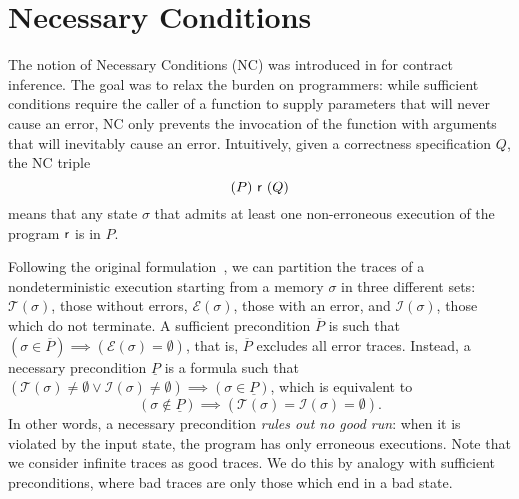 \section{Necessary Conditions}\label{sec:bg:nc}
The notion of Necessary Conditions (NC) was introduced in \cite{CCL11,CCFL13} for contract inference.
The goal was to relax the burden on programmers: while sufficient conditions require the caller of a function to supply parameters that will never cause an error, NC only prevents the invocation of the function with arguments that will inevitably cause an error.
Intuitively, given a correctness specification $Q$, the NC triple
\[
(P)~\mathsf{r}~(Q)
\]
means that any state $\sigma$ that admits at least one non-erroneous execution of the program $\mathsf{r}$ is in $P$.

Following the original formulation~\cite{CCFL13}, we can partition the traces of a nondeterministic execution starting from a memory $\sigma$ in three different sets: $\mathcal{T}(\sigma)$, those without errors, $\mathcal{E}(\sigma)$, those with an error, and $\mathcal{I}(\sigma)$, those which do not terminate.
A sufficient precondition $\overline{P}$ is such that $(\sigma \in \overline{P}) \implies (\mathcal{E}(\sigma) = \emptyset)$, that is, $\overline{P}$ excludes all error traces.
Instead, a necessary precondition $\underline{P}$ is a formula such that $(\mathcal{T}(\sigma) \neq \emptyset \lor \mathcal{I}(\sigma) \neq \emptyset) \implies (\sigma \in \underline{P})$, which is equivalent to
\[
(\sigma \notin \underline{P}) \implies (\mathcal{T}(\sigma) = \mathcal{I}(\sigma) = \emptyset) .
\]
In other words, a necessary precondition \emph{rules out no good run}: when it is violated by the input state, the program has only erroneous executions.
Note that we consider infinite traces as good traces. We do this by analogy with sufficient preconditions, where bad traces are only those which end in a bad state.

